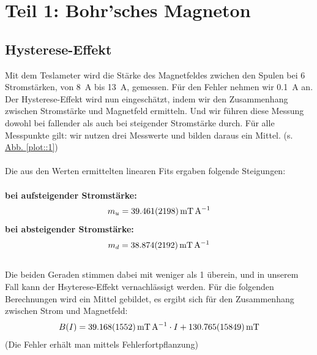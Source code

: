 \section{Teil 1: Bohr'sches Magneton}
  \subsection{Hysterese-Effekt}
    Mit dem Teslameter wird die Stärke des Magnetfeldes zwichen den Spulen bei 6 Stromstärken, von \SI{8}{\ampere} bis \SI{13}{\ampere}, gemessen. Für den Fehler nehmen wir \SI{0.1}{\ampere} an. Der Hysterese-Effekt wird nun eingeschätzt, indem wir den Zusammenhang zwischen Stromstärke und Magnetfeld ermitteln. Und wir führen diese Messung dowohl bei fallender als auch bei steigender Stromstärke durch. Für alle Messpunkte gilt: wir nutzen drei Messwerte und bilden daraus ein Mittel. (s. \hyperref[plot::1]{Abb. \ref*{plot::1}})\\\\
    Die aus den Werten ermittelten linearen Fits ergaben folgende Steigungen:\\\\
    \textbf{bei aufsteigender Stromstärke:}
      \begin{align}
        m_u = \SI{39.461+-2.198}{\milli\tesla\per\ampere}
      \end{align}
    \textbf{bei absteigender Stromstärke:}
      \begin{align}
        m_d = \SI{38.874+-2.192}{\milli\tesla\per\ampere}
      \end{align}\\
    Die beiden Geraden stimmen dabei mit weniger als \SI{1}{\sigma} überein, und in unserem Fall kann der Hsyterese-Effekt vernachlässigt werden. Für die folgenden Berechnungen wird ein Mittel gebildet, es ergibt sich für den Zusammenhang zwischen Strom und Magnetfeld:
    \begin{align}
      B(I) = \SI{39.168+-1.552}{\milli\tesla\per\ampere} \cdot I + \SI{130.765+-15.849}{\milli\tesla}
    \end{align}
    (Die Fehler erhält man mittels Fehlerfortpflanzung)

